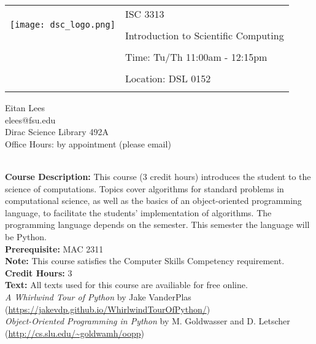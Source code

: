 \documentclass[11pt]{article}
\begin{document}
\begin{tabular}{ l l }
  \multirow{3}{*}{\texttt{[image: dsc\_logo.png]}} & \LARGE ISC 3313 \\\\
  & \LARGE Introduction to Scientific Computing \\\\
  & \LARGE Time: Tu/Th 11:00am - 12:15pm \\\\
  & \LARGE Location: DSL 0152 \\\\
\end{tabular}
\vspace{10mm}

\large Eitan Lees\\
\large elees@fsu.edu \\
 \large Dirac Science Library 492A \\
 \large Office Hours: by appointment (please email) \\
\vspace{5mm}

\textbf {\large \\ Course Description:} This course (3 credit hours) introduces the student to the science of computations. Topics cover algorithms for standard problems in computational science, as well as the basics of an object-oriented programming language, to facilitate the students' implementation of algorithms. The programming language depends on the semester. This semester the language will be Python. \\

\textbf {Prerequisite:} MAC 2311\\

\textbf {Note:} This course satisfies the Computer Skills Competency requirement. \\

\textbf {Credit Hours:} 3 \\

\textbf {\large Text:} All texts used for this course are availiable for free online.\\
\textit{A Whirlwind Tour of Python} by Jake VanderPlas \\
(\url{https://jakevdp.github.io/WhirlwindTourOfPython/})\\
\textit{Object-Oriented Programming in Python} by M. Goldwasser and D. Letscher \\
(\url{http://cs.slu.edu/~goldwamh/oopp}) \\
\end{document}
